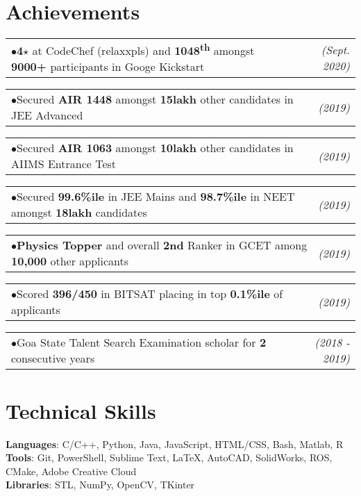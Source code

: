 \documentclass[a4paper,11pt]{article}
\makeatletter
\newcommand{\extracurr}[2]{
    \begin{tabular*}{0.977\textwidth}{l@{\extracolsep{\fill}}r}
        \tiny{$\bullet$}\hspace{7pt}\small{#1} & \textit{\small{#2}} \\
    \end{tabular*}\vspace{-11pt}
}
\makeatother
\begin{document}
  \section{Achievements}
    \begin{adjustwidth}{10.8pt}{}
          \extracurr{\textbf{4\hspace{1pt}$\star$} at CodeChef (relaxxpls) and \textbf{1048\textsuperscript{th}} amongst \textbf{9000+} participants in Googe Kickstart} {(Sept. 2020)}
          
          \extracurr{Secured \textbf{AIR 1448} amongst \textbf{15lakh} other candidates in JEE Advanced}{(2019)}
          
          \extracurr{Secured \textbf{AIR 1063} amongst \textbf{10lakh} other candidates in AIIMS Entrance Test}{(2019)}
          
          \extracurr{Secured \textbf{99.6\%ile} in JEE Mains and \textbf{98.7\%ile} in NEET amongst \textbf{18lakh} candidates}{(2019)}
          
          \extracurr{\textbf{Physics Topper} and overall \textbf{2nd} Ranker in GCET among \textbf{10,000} other applicants} {(2019)}
          
          \extracurr{Scored \textbf{396/450} in BITSAT placing in top \textbf{0.1\%ile} of applicants}{(2019)}
          
          \extracurr{Goa State Talent Search Examination scholar for \textbf{2} consecutive years}{(2018 - 2019)}
        
    \end{adjustwidth}

  \section{Technical Skills}
    \begin{itemize}[leftmargin=0.15in, label={}]
        \small{\item{
          \textbf{Languages}{: C/C++, Python, Java, JavaScript, HTML/CSS, Bash, Matlab, R} \\ 
        \vspace{1.3mm}
          \textbf{Tools}{: Git, PowerShell, Sublime Text, \LaTeX, AutoCAD, SolidWorks, ROS, CMake, Adobe Creative Cloud} \\ 
        \vspace{1.3mm}
          \textbf{Libraries}{: STL, NumPy, OpenCV, TKinter} 
        }}
    \end{itemize}
\end{document}
